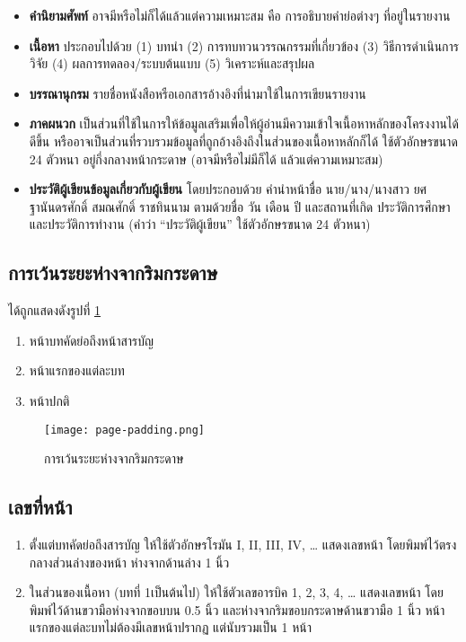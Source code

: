 \begin{itemize}
    \item \textbf{คำนิยามศัพท์} อาจมีหรือไม่ก็ได้แล้วแต่ความเหมาะสม คือ การอธิบายคำย่อต่างๆ ที่อยู่ในรายงาน
    \item \textbf{เนื้อหา} ประกอบไปด้วย (1) บทนำ (2) การทบทวนวรรณกรรมที่เกี่ยวข้อง (3) วิธีการดำเนินการวิจัย (4) ผลการทดลอง/ระบบต้นแบบ (5) วิเคราะห์และสรุปผล
    \item \textbf{บรรณานุกรม} รายชื่อหนังสือหรือเอกสารอ้างอิงที่นำมาใช้ในการเขียนรายงาน
    \item \textbf{ภาคผนวก} เป็นส่วนที่ใช้ในการให้ข้อมูลเสริมเพื่อให้ผู้อ่านมีความเข้าใจเนื้อหาหลักของโครงงานได้ดีขึ้น หรืออาจเป็นส่วนที่รวบรวมข้อมูลที่ถูกอ้างอิงถึงในส่วนของเนื้อหาหลักก็ได้ ใช้ตัวอักษรขนาด 24 ตัวหนา อยู่กึ่งกลางหน้ากระดาษ (อาจมีหรือไม่มีก็ได้ แล้วแต่ความเหมาะสม)
    \item \textbf{ประวัติผู้เขียนข้อมูลเกี่ยวกับผู้เขียน} โดยประกอบด้วย คำนำหน้าชื่อ นาย/นาง/นางสาว ยศ ฐานันดรศักดิ์ สมณศักดิ์ ราชทินนาม ตามด้วยชื่อ วัน เดือน ปี และสถานที่เกิด ประวัติการศึกษาและประวัติการทำงาน (คำว่า ``ประวัติผู้เขียน'' ใช้ตัวอักษรขนาด 24 ตัวหนา)
\end{itemize}

\subsection{การเว้นระยะห่างจากริมกระดาษ}
    ได้ถูกแสดงดังรูปที่ \ref{fig:page-padding}
    \begin{enumerate}
        \item หน้าบทคัดย่อถึงหน้าสารบัญ
        \item หน้าแรกของแต่ละบท
        \item หน้าปกติ
    \end{enumerate}

    \begin{figure}[ht]
        \centering
        \texttt{[image: page-padding.png]}
        \caption{การเว้นระยะห่างจากริมกระดาษ}
        \label{fig:page-padding}
    \end{figure}

\subsection{เลขที่หน้า}

\begin{enumerate}
    \item ตั้งแต่บทคัดย่อถึงสารบัญ ให้ใช้ตัวอักษรโรมัน I, II, III, IV, … แสดงเลขหน้า โดยพิมพ์ไว้ตรงกลางส่วนล่างของหน้า ห่างจากด้านล่าง 1 นิ้ว
    \item ในส่วนของเนื้อหา (บทที่ 1เป็นต้นไป) ให้ใช้ตัวเลขอารบิค 1, 2, 3, 4, … แสดงเลขหน้า โดยพิมพ์ไว้ด้านขวามือห่างจากขอบบน 0.5 นิ้ว และห่างจากริมขอบกระดาษด้านขวามือ 1 นิ้ว หน้าแรกของแต่ละบทไม่ต้องมีเลขหน้าปรากฏ แต่นับรวมเป็น 1 หน้า
\end{enumerate}

